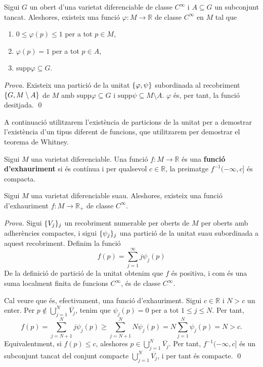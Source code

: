 \begin{corol}
    Sigui $G$ un obert d'una varietat diferenciable de classe $C^\infty$ i $A\subseteq G$ un subconjunt tancat. Aleshores, existeix una funció $\varphi:M\to\mathbb R$ de classe $C^\infty$ en $M$ tal que
    \begin{enumerate}
        \item $0\leq\varphi(p)\leq 1$ per a tot $p\in M$,
        \item $\varphi(p) = 1$ per a tot $p\in A$,
        \item $\text{supp}\varphi\subseteq G$.
    \end{enumerate}
\end{corol}
{
\color{green!50!black} \textit{Prova.} 
Existeix una partició de la unitat $\{\varphi, \psi\}$ subordinada al recobriment $\{G, M\setminus A\}$ de $M$ amb $\text{supp}\varphi\subseteq G$ i $\text{supp}\psi\subseteq M\setminus A$. $\varphi$ és, per tant, la funció desitjada. \qed
}

A continuació utilitzarem l'existència de particions de la unitat per a demostrar l'existència d'un tipus diferent de funcions, que utilitzarem per demostrar el teorema de Whitney.

\begin{defi}\label{def:funció_exhauriment}
    Sigui $M$ una varietat diferenciable. Una funció $f:M\to\mathbb R$ és una \textbf{funció d'exhauriment} si és contínua i per qualsevol $c\in\mathbb R$, la preimatge $f^{-1}(-\infty,c]$ és compacta.
\end{defi}

\begin{prop}
    Sigui $M$ una varietat diferenciable suau. Aleshores, existeix una funció d'exhauriment $f:M\to\mathbb R_+$ de classe $C^\infty$.
\end{prop}
{
    \color{green!50!black} \textit{Prova.} 
    Sigui $\{V_j\}_j$ un recobriment numerable per oberts de $M$ per oberts amb adherències compactes, i sigui $\{\psi_j\}_j$ una partició de la unitat suau subordinada a aquest recobriment. Definim la funció
    \begin{equation*}
        f(p) = \sum_{j=1}^\infty j\psi_j(p)
    \end{equation*}
    De la definició de partició de la unitat obtenim que $f$ és positiva, i com és una suma localment finita de funcions $C^\infty$, és de classe $C^\infty$.

    Cal veure que és, efectivament, una funció d'exhauriment. Sigui $c\in\mathbb R$ i $N>c$ un enter. Per $p\not\in\bigcup_{j=1}^N \overline{V_j}$, tenim que $\psi_j(p)=0$ per a tot $1\le j\le N$. Per tant,
    \begin{equation*}
        f(p) = \sum_{j=N+1}^N j\psi_j(p) \ge \sum_{j=N+1}^N N\psi_j(p) =N\sum_{j=1}^N\psi_j(p) = N>c.
    \end{equation*}
    Equivalentment, si $f(p)\le c$, aleshores $p\in\bigcup_{j=1}^N \overline{V_j}$. Per tant, $f^{-1}(-\infty,c]$ és un subconjunt tancat del conjunt compacte $\bigcup_{j=1}^N \overline{V_j}$, i per tant és compacte.
    \qed
}



